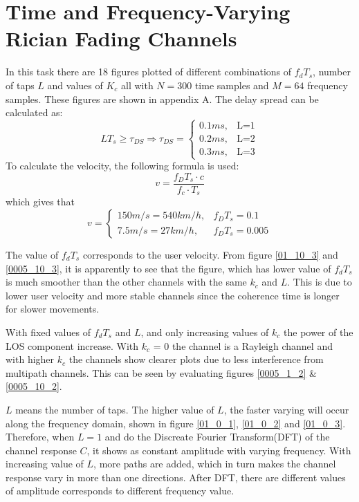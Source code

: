 \documentclass[conference]{IEEEtran}
\begin{document}
\section{Time and Frequency-Varying Rician Fading Channels}
\label{task2}
In this task there are 18 figures plotted of different combinations of $f_dT_s$, number of taps $L$ and values of $K_c$ all with $N = 300$ time samples and $M = 64$ frequency samples. These figures are shown in appendix A.
    The delay spread can be calculated as: $$LT_{s} \geq \tau_{DS} \Rightarrow \tau_{DS} = 
    \begin{cases}
        0.1ms,& \text{L=1} \\
        0.2ms,& \text{L=2} \\
        0.3ms,& \text{L=3}
    \end{cases}$$
    To calculate the velocity, the following formula is used:
    $$v = \frac{f_{D}T_{s}\cdot c}{f_{c}\cdot T_{s}}$$
    which gives that
    $$ v = 
    \begin{cases}
       150m/s=540km/h,& \text{$f_{D}T_{s}=0.1$}\\
       7.5m/s=27km/h,& \text{$f_{D}T_{s}=0.005$}
    \end{cases}$$
    
    The value of $f_{d}T_{s}$ corresponds to the user velocity. From figure \ref{01_10_3} and \ref{0005_10_3}, it is apparently to see that the figure, which has lower value of $f_{d}T_{s}$ is much smoother than the other channels with the same $k_{c}$ and $L$. This is due to lower user velocity and more stable channels since the coherence time is longer for slower movements.
    
    With fixed values of $f_{d}T_{s}$ and $L$, and only increasing values of $k_{c}$ the power of the LOS component increase. With $k_{c}$ = 0 the channel is a Rayleigh channel and with higher $k_{c}$ the channels show clearer plots due to less interference from multipath channels.  This can be seen by evaluating figures \ref{0005_1_2} \& \ref{0005_10_2}.
    
    $L$ means the number of taps. The higher value of $L$, the faster varying will occur along the frequency domain, shown in figure \ref{01_0_1}, \ref{01_0_2} and \ref{01_0_3}. Therefore, when $L = 1$ and do the Discreate Fourier Transform(DFT) of the channel response $C$, it shows as constant amplitude with varying frequency. With increasing value of $L$, more paths are added, which in turn makes the channel response vary in more than one directions. After DFT, there are different values of amplitude corresponds to different frequency value.
\end{document}
